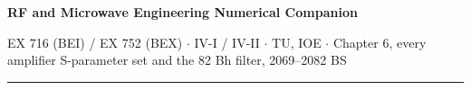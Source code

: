\documentclass[10pt]{article}
\begin{document}
{\LARGE\bfseries RF and Microwave Engineering \gap\textcolor{sub}{Numerical Companion}}\par
{\footnotesize\color{sub} EX 716 (BEI) / EX 752 (BEX) $\cdot$ IV-I / IV-II $\cdot$ TU, IOE
$\cdot$ Chapter 6, every amplifier S-parameter set and the 82 Bh filter, 2069--2082 BS}
\vspace{3pt}\hrule\vspace{4pt}

\setcounter{section}{5}



\end{document}
